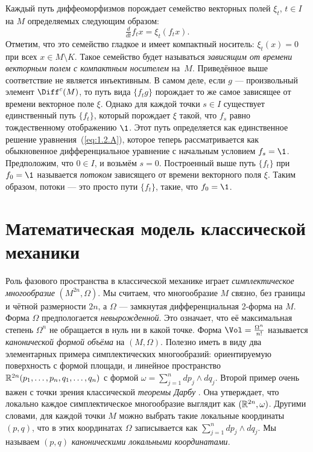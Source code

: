 Каждый путь диффеоморфизмов порождает семейство векторных полей $\xi_t$, $t \in I$ на $M$ определяемых следующим образом: 
\begin{equation}\tfrac{d}{dt} f_t x = \xi_t (f_t x).
\label{eq:1.2.A}
\end{equation}
Отметим, что это семейство гладкое и имеет компактный носитель: $\xi_t (x) = 0$ при всех $x \in M \setminus K$.
Такое семейство будет называться \textit{зависящим от времени векторным полем с компактным носителем} на~$M$.
Приведённое выше соответствие не является инъективным.
В самом деле, если $g$ — произвольный элемент $\Diff^c (M)$, то путь вида $\{f_t g\}$ порождает то же самое зависящее от времени векторное поле $\xi$.
Однако для каждой точки $s \in I$ существует единственный путь $\{f_t\}$, который 
порождает $\xi$ такой, что $f_s$ равно тождественному отображению $\1$.
Этот путь определяется как единственное решение уравнения~(\ref{eq:1.2.A}), которое теперь рассматривается как обыкновенное дифференциальное уравнение с начальным условием $f_s = \1$.
Предположим, что $0 \in I$, и возьмём $s = 0$.
Построенный выше путь $\{f_t\}$ при $f_0 = \1$ называется \emph{потоком} зависящего от времени векторного поля $\xi$.
Таким образом, потоки — это просто пути $\{f_t\}$, такие, что $f_0 = \1$.

\section[Классическая механика]{Математическая модель классической механики}

Роль фазового пространства в классической механике играет \emph{симплектическое многообразие} $(M^{2n},\Omega)$.
Мы считаем, что многообразие $M$ связно, без границы и чётной размерности $2n$, а $\Omega$ — замкнутая дифференциальная 2-форма на $M$.
Форма $\Omega$ предпологается {}\emph{невырожденной}.
Это означает, что её максимальная степень $\Omega^n$ не обращается в нуль ни в какой точке.
Форма $\Vol =  \tfrac{\Omega^n}{n!}$ называется \emph{канонической формой объёма} на $(M, \Omega)$.
Полезно иметь в виду два элементарных примера симплектических многообразий:
ориентируемую поверхность с формой площади, и линейное пространство $\RR^{2n} (p_1,\z\dots, p_n, q_1,\z\dots, q_n)$ с формой $\omega = \sum^n_{j = 1} dp_j \wedge dq_j$.
Второй пример очень важен с точки зрения классической \emph{теоремы Дарбу} \cite{MS}.
Она утверждает, что локально каждое симплектическое многообразие выглядит как $(\mathbb{R}^{2n}, \omega)$.
Другими словами, для каждой точки $M$ можно выбрать такие локальные координаты $(p, q)$, что в этих координатах $\Omega$ записывается как $\sum^n_{j = 1} dp_j \wedge dq_j$.
Мы называем $(p, q)$ \emph{каноническими локальными координатами}.

